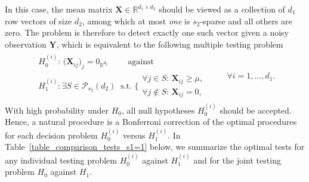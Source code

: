\documentclass{article}
\newcommand{\R}{\mathbb{R}}
\theoremstyle{remark}
\begin{document}
In this case, the mean matrix $\mathbf X \in \R^{d_1 \times d_2}$ should be viewed as a collection of $d_1$ row vectors of size $d_2$, among which at most \textit{one} is $s_2$-sparse and all others are zero. 
The problem is therefore to detect exactly one such vector given a noisy observation $\mathbf Y$, which is equivalent to the following multiple testing problem
\begin{align}
\begin{array}{l}
     H_{0}^{(i)}: \,\big(\mathbf X_{i j}\big)_j = 0_{\R^{d_2}} \qquad \text{ against }\\[10pt]
     H_{1}^{(i)}: \exists S \in \mathcal{P}_{s_2}(d_2) ~\text{ s.t. } \Bigg\{\begin{array}{ll}
        \!\!\forall j \in S: \, \mathbf X_{i j} \geq \mu,\\[-2pt]
        \!\!\forall j \notin S: \, \mathbf X_{i j} = 0 ,
    \end{array} 
\end{array}
       \qquad \forall i = 1,\dots, d_1. \label{eq_multiple_testing}
\end{align}
With high probability under $H_0$, all null hypotheses $H_0^{(i)}$ should be accepted. 
Hence, a natural procedure is a Bonferroni correction of the optimal procedures for each decision problem $H_0^{(i)}$ versus $H_1^{(i)}$. 
In Table~\ref{table_comparison_tests_s1=1} below, we summarize the optimal tests for any individual testing problem $H_0^{(i)}$ against $H_1^{(i)}$ and for the joint testing problem $H_0$ against $H_1$.
\end{document}
